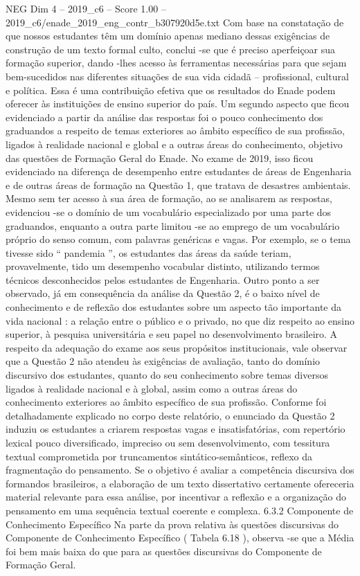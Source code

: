 \begin{textsample}{NEG Dim 4 – 2019\_c6 – Score 1.00 – 2019\_c6/enade\_2019\_eng\_contr\_b307920d5e.txt}
Com base na constatação de que nossos estudantes têm um domínio apenas mediano dessas exigências de construção de um texto formal culto, conclui -se que é preciso aperfeiçoar sua formação superior, dando -lhes acesso às ferramentas necessárias para que sejam bem-sucedidos nas diferentes situações de sua vida cidadã – profissional, cultural e política.
Essa é uma contribuição efetiva que os resultados do Enade podem oferecer às instituições de ensino superior do país.
Um segundo aspecto que ficou evidenciado a partir da análise das respostas foi o pouco conhecimento dos graduandos a respeito de temas exteriores ao âmbito específico de sua profissão, ligados à realidade nacional e global e a outras áreas do conhecimento, objetivo das questões de Formação Geral do Enade.
No exame de 2019, isso ficou evidenciado na diferença de desempenho entre estudantes de áreas de Engenharia e de outras áreas de formação na Questão 1, que tratava de desastres ambientais.
Mesmo sem ter acesso à sua área de formação, ao se analisarem as respostas, evidenciou -se o domínio de um vocabulário especializado por uma parte dos graduandos, enquanto a outra parte limitou -se ao emprego de um vocabulário próprio do senso comum, com palavras genéricas e vagas.
Por exemplo, se o tema tivesse sido “ pandemia ”, os estudantes das áreas da saúde teriam, provavelmente, tido um desempenho vocabular distinto, utilizando termos técnicos desconhecidos pelos estudantes de Engenharia.
Outro ponto a ser observado, já em consequência da análise da Questão 2, é o baixo nível de conhecimento e de reflexão dos estudantes sobre um aspecto tão importante da vida nacional : a relação entre o público e o privado, no que diz respeito ao ensino superior, à pesquisa universitária e seu papel no desenvolvimento brasileiro.
A respeito da adequação do exame aos seus propósitos institucionais, vale observar que a Questão 2 não atendeu às exigências de avaliação, tanto do domínio discursivo dos estudantes, quanto do seu conhecimento sobre temas diversos ligados à realidade nacional e à global, assim como a outras áreas do conhecimento exteriores ao âmbito específico de sua profissão.
Conforme foi detalhadamente explicado no corpo deste relatório, o enunciado da Questão 2 induziu os estudantes a criarem respostas vagas e insatisfatórias, com repertório lexical pouco diversificado, impreciso ou sem desenvolvimento, com tessitura textual comprometida por truncamentos sintático-semânticos, reflexo da fragmentação do pensamento.
Se o objetivo é avaliar a competência discursiva dos formandos brasileiros, a elaboração de um texto dissertativo certamente ofereceria material relevante para essa análise, por incentivar a reflexão e a organização do pensamento em uma sequência textual coerente e complexa. 6.3.2 Componente de Conhecimento Específico Na parte da prova relativa às questões discursivas do Componente de Conhecimento Específico ( Tabela 6.18 ), observa -se que a Média foi bem mais baixa do que para as questões discursivas do Componente de Formação Geral.

\end{textsample}
